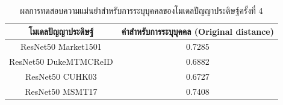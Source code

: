 \begin{table}[!ht]
    \centering
    \begin{tabular}{|c|c|}
		\hline
		{โมเดลปัญญาประดิษฐ์}&{ค่าสำหรับการระบุบุคคล (Original distance)}							\\
		\hline
		ResNet50 Market1501	 			& 0.7285								\\
		ResNet50 DukeMTMCReID			& 0.6882								\\
		ResNet50 CUHK03				& 0.6727								\\
		ResNet50 MSMT17				& 0.7408								\\
	\hline
    \end{tabular}
    \caption{ผลการทดสอบความแม่นยำสำหรับการระบุบุคคลของโมเดลปัญญาประดิษฐ์ครั้งที่ 4}
    \label{tab: Original distant of image 4}
\end{table}
\begin{figure}[!ht]
    \centering
    \begin{subfigure}[b]{0.1\textwidth}
        \centering

\end{subfigure}
\end{figure}

